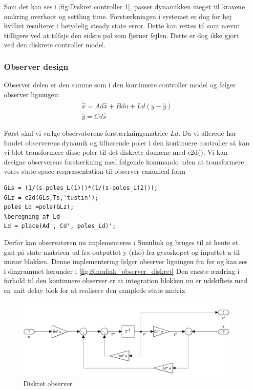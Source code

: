 Som det kan ses i \autoref{fig:Diskret controller 1}, passer dynamikken meget til kravene omkring overhoot og settling time. Forstærkningen i systemet er dog for høj hvilket resulterer i betydelig steady state error. Dette kan rettes til som nævnt tidligere ved at tilføje den sidste pol som fjerner fejlen. Dette er dog ikke gjort ved den diskrete controller model. 

\subsubsection{Observer design}
Observer delen er den samme som i den kontinuere controller model og følger observer ligningen:
\begin{gather}
\dot{\hat{x}}=Ad\hat{x}+Bdu+Ld(y-\hat{y}) \\
\hat{y}=Cd\hat{x}
\end{gather}

Først skal vi vælge observatørens forstærkningsmatrice $ Ld $. Da vi allerede har fundet observerens dynamik og tilhørende poler i den kontinuere controller så kan vi blot transformere disse poler til det diskrete domæne med c2d(). Vi kan designe observerens forstærkning med følgende kommando uden at transformere vores state space respræsentation til observer canonical form
\begin{lstlisting}[frame=single]
%valg af Ld poler 
GLs = (1/(s-poles_L(1)))*(1/(s-poles_L(2)));
GLz = c2d(GLs,Ts,'tustin');
poles_Ld =pole(GLz);
%beregning af Ld
Ld = place(Ad', Cd', poles_Ld)';  
\end{lstlisting}

Derfor kan observatøren nu implementeres i Simulink og bruges til at hente et gæt på state matricen ud fra outputtet y (rho) fra gyroskopet og inputtet u til motor blokken. Denne implementering følger observer ligningen fra før og kan ses i diagrammet herunder i \autoref{fig:Simulink_observer_diskret}
Den eneste ændring i forhold til den kontinuere observer er at integration blokken nu er udskiftets med en unit delay blok for at realisere den samplede state matrix   

\begin{figure}[H]
	\centering
	\includegraphics[width = 1\textwidth]{figur/Simulink_observer_diskret}
	\caption{Diskret observer}
	\label{fig:Simulink_observer_diskret}
\end{figure}


